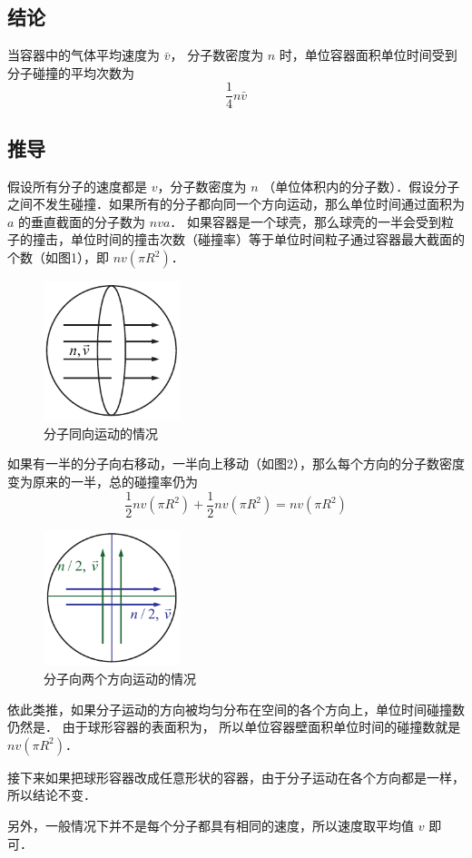 \subsection{结论}

当容器中的气体平均速度为 $\bar v$， 分子数密度为 $n$ 时，单位容器面积单位时间受到分子碰撞的平均次数为
\begin{equation}
\frac{1}{4}n\bar v
\end{equation}
\subsection{推导}

假设所有分子的速度都是 $v$，分子数密度为 $n$ （单位体积内的分子数）．假设分子之间不发生碰撞．如果所有的分子都向同一个方向运动，那么单位时间通过面积为 $a$ 的垂直截面的分子数为 $nva$． 如果容器是一个球壳，那么球壳的一半会受到粒子的撞击，单位时间的撞击次数（碰撞率）等于单位时间粒子通过容器最大截面的个数（如图1），即 $nv\left( {\pi {R^2}} \right)$． 
\begin{figure}[h]
\centering
\includegraphics[width=4cm]{./figures/AvgHit1.pdf}
\caption{分子同向运动的情况} \label{Sample_fig1}
\end{figure}
如果有一半的分子向右移动，一半向上移动（如图2），那么每个方向的分子数密度变为原来的一半，总的碰撞率仍为
\begin{equation}
\frac{1}{2}nv\left( {\pi {R^2}} \right) + \frac{1}{2}nv\left( {\pi {R^2}} \right) = nv\left( {\pi {R^2}} \right)
\end{equation}

\begin{figure}[h]
\centering
\includegraphics[width=4cm]{./figures/AvgHit2.pdf}
\caption{分子向两个方向运动的情况} \label{Sample_fig1}
\end{figure}
依此类推，如果分子运动的方向被均匀分布在空间的各个方向上，单位时间碰撞数仍然是．
由于球形容器的表面积为， 所以单位容器壁面积单位时间的碰撞数就是 $nv\left( {\pi {R^2}} \right)$． 

接下来如果把球形容器改成任意形状的容器，由于分子运动在各个方向都是一样，所以结论不变．

另外，一般情况下并不是每个分子都具有相同的速度，所以速度取平均值 $v$ 即可．


